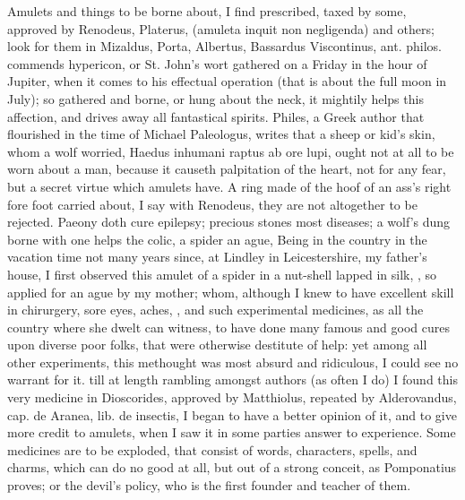 Amulets and things to be borne about, I find prescribed, taxed by some,
approved by Renodeus, Platerus, (amuleta inquit non negligenda) and
others; look for them in Mizaldus, Porta, Albertus, \etc{} Bassardus
Viscontinus, ant. philos. commends hypericon, or St. John's wort
gathered on a Friday in the hour of Jupiter, when it comes to his
effectual operation (that is about the full moon in July); so gathered
and borne, or hung about the neck, it mightily helps this affection,
and drives away all fantastical spirits. Philes, a Greek author
that flourished in the time of Michael Paleologus, writes that a sheep
or kid's skin, whom a wolf worried, Haedus inhumani raptus ab ore
lupi, ought not at all to be worn about a man, because it causeth
palpitation of the heart, not for any fear, but a secret virtue which
amulets have. A ring made of the hoof of an ass's right fore foot
carried about, \etc{} I say with Renodeus, they are not altogether
to be rejected. Paeony doth cure epilepsy; precious stones most
diseases; a wolf's dung borne with one helps the colic, a
spider an ague, \etc{} Being in the country in the vacation time not many
years since, at Lindley in Leicestershire, my father's house, I first
observed this amulet of a spider in a nut-shell lapped in silk, \etc{}, so
applied for an ague by my mother; whom, although I knew to have
excellent skill in chirurgery, sore eyes, aches, \etc{}, and such
experimental medicines, as all the country where she dwelt can witness,
to have done many famous and good cures upon diverse poor folks, that
were otherwise destitute of help: yet among all other experiments, this
methought was most absurd and ridiculous, I could see no warrant for
it.  till at length rambling
amongst authors (as often I do) I found this very medicine in
Dioscorides, approved by Matthiolus, repeated by Alderovandus, \textlatin{cap. de
Aranea, lib. de insectis}, I began to have a better opinion of it, and
to give more credit to amulets, when I saw it in some parties answer to
experience. Some medicines are to be exploded, that consist of words,
characters, spells, and charms, which can do no good at all, but out of
a strong conceit, as Pomponatius proves; or the devil's policy, who is
the first founder and teacher of them.

